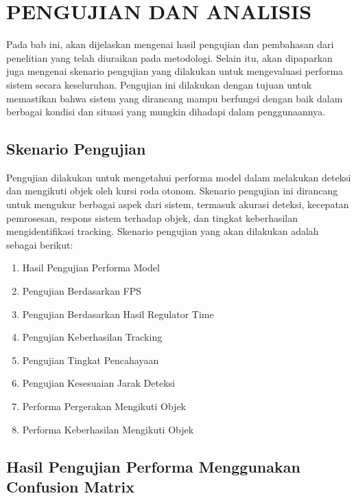 \chapter{PENGUJIAN DAN ANALISIS}
\label{chap:pengujiananalisis}


Pada bab ini, akan dijelaskan mengenai hasil pengujian dan pembahasan dari penelitian yang telah diuraikan pada metodologi. Selain itu, akan dipaparkan juga mengenai skenario pengujian yang dilakukan untuk mengevaluasi performa sistem secara keseluruhan. Pengujian ini dilakukan dengan tujuan untuk memastikan bahwa sistem yang dirancang mampu berfungsi dengan baik dalam berbagai kondisi dan situasi yang mungkin dihadapi dalam penggunaannya.

\section{Skenario Pengujian}
\label{sec:skenariopengujian}

Pengujian dilakukan untuk mengetahui performa model dalam melakukan deteksi dan mengikuti objek oleh kursi roda otonom. Skenario pengujian ini dirancang untuk mengukur berbagai aspek dari sistem, termasuk akurasi deteksi, kecepatan pemrosesan, respons sistem terhadap objek, dan tingkat keberhasilan mengidentifikasi tracking. Skenario pengujian yang akan dilakukan adalah sebagai berikut:

\begin{enumerate}
    \item Hasil Pengujian Performa Model
    \item Pengujian Berdasarkan FPS
    \item Pengujian Berdasarkan Hasil Regulator Time
    \item Pengujian Keberhasilan Tracking
    \item Pengujian Tingkat Pencahayaan
    \item Pengujian Kesesuaian Jarak Deteksi
    \item Performa Pergerakan Mengikuti Objek
    \item Performa Keberhasilan Mengikuti Objek
\end{enumerate}

\newpage
\section{Hasil Pengujian Performa Menggunakan Confusion Matrix}
\label{sec:hasilperformaconfisionMatrix}


